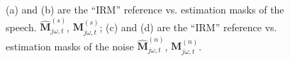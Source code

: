 \begin{figure}[H]
    \centering
    \hspace{0.1cm}
    \vspace{-0.35cm}
    \hspace{0.1cm}
        \caption{(a) and (b) are the ``IRM'' 
        reference vs. estimation masks of the speech.
        \(\mathbf{\widehat{M}}^{(s)}_{j\omega, t}\), \(\mathbf{M}^{(s)}_{j\omega, t}\);\;\;
        (c) and (d) are the ``IRM'' reference vs. estimation masks 
        of the noise \(\mathbf{\widehat{M}}^{(n)}_{j\omega, t}\), \(\mathbf{M}^{(n)}_{j\omega, t}\).}\label{fig:irm_ref_s_n} 
\end{figure}


